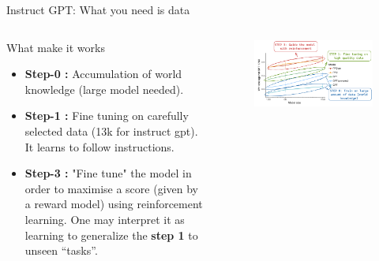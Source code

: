 \documentclass[10pt,aspectratio=169]{beamer}
\begin{document}
\begin{frame}{Instruct GPT: What you need is data}

    \begin{columns}
        \begin{column}{0.5\textwidth}
            \begin{alertblock}{What make it works}
                \begin{itemize}
                    \item \textbf{Step-0 :} Accumulation of world knowledge (large model needed).
                    \item \textbf{Step-1 :}  Fine tuning on carefully selected data (13k for instruct gpt). It learns to follow instructions.
                    \item \textbf{Step-3 :} "Fine tune" the model  in order to maximise a score (given by a reward model) using reinforcement learning. One may interpret it as learning to generalize the \textbf{step 1} to unseen ``tasks''.
                \end{itemize}

            \end{alertblock}

        \end{column}
        \begin{column}{0.6\textwidth}  %
            \begin{figure}
                \centering
                \includegraphics[width=1.\textwidth]{media/why-chatgpt.png}
                
                
            \end{figure}
        \end{column}
    \end{columns}
\end{frame}
\end{document}
